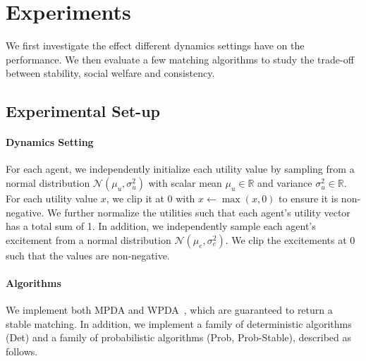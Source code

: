 \section{Experiments}
We first investigate the effect different dynamics settings have on the performance. We then evaluate a few matching algorithms to study the trade-off between stability, social welfare and consistency.
\subsection{Experimental Set-up}
\paragraph{Dynamics Setting} For each agent, we independently initialize each utility value by sampling from a normal distribution $\mathcal{N}(\mu_u, \sigma_u^2)$ with scalar mean $\mu_u \in \mathbb{R}$ and variance $\sigma_u^2 \in \mathbb{R}$. For each utility value $x$, we clip it at 0 with $x \leftarrow \max(x, 0)$ to ensure it is non-negative. We further normalize the utilities such that each agent's utility vector has a total sum of 1. In addition, we independently sample each agent's excitement from a normal distribution $\mathcal{N}(\mu_e, \sigma_e^2)$. We clip the excitements at 0 such that the values are non-negative.

\paragraph{Algorithms} We implement both MPDA and WPDA~\cite{galeshapley1962}, which are guaranteed to return a stable matching. In addition, we implement a family of deterministic algorithms (Det) and a family of probabilistic algorithms (Prob, Prob-Stable), described as follows.

